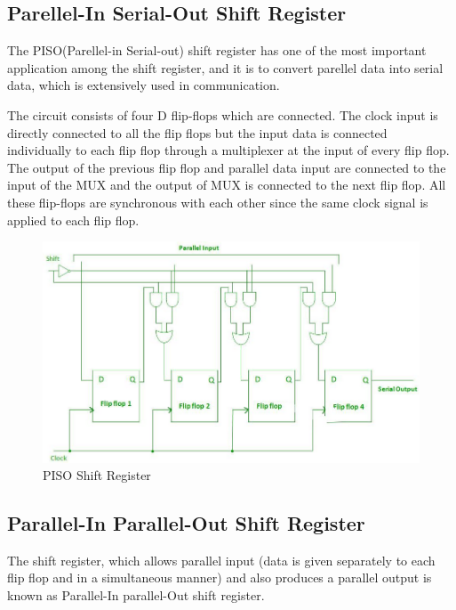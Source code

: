 \documentclass[12pt]{article}
\begin{document}
\subsection{Parellel-In Serial-Out Shift Register}
The PISO(Parellel-in Serial-out) shift register has one of the most important application among the shift register, and it is to convert parellel data into serial data, which is extensively used in communication.

\noindent The circuit consists of four D flip-flops which are connected. The clock input is directly connected to all the flip flops but the input data is connected individually to each flip flop through a multiplexer at the input of every flip flop. The output of the previous flip flop and parallel data input are connected to the input of the MUX and the output of MUX is connected to the next flip flop. All these flip-flops are synchronous with each other since the same clock signal is applied to each flip flop.
\begin{figure}[H]
    \centering
    \includegraphics[scale=0.6]{circuit diagram/PISO.png}
    \caption{PISO Shift Register}
\end{figure}

\subsection{Parallel-In Parallel-Out Shift Register}
The shift register, which allows parallel input (data is given separately to each flip flop and in a simultaneous manner) and also produces a parallel output is known as Parallel-In parallel-Out shift register.
\end{document}
